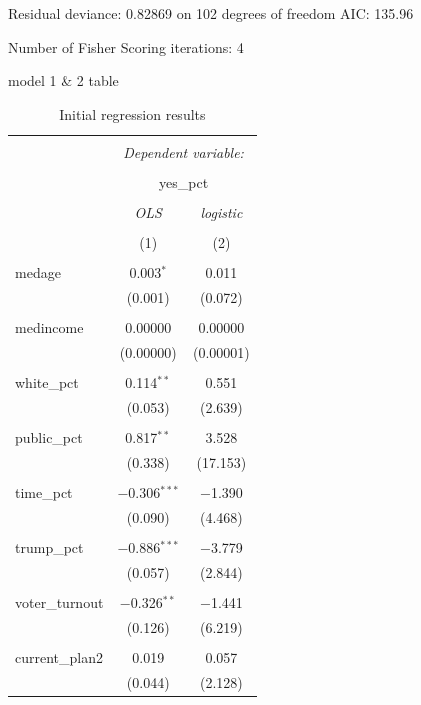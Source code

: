 \documentclass[
]{article}
\begin{document}
Residual deviance: 0.82869 on 102 degrees of freedom AIC: 135.96

Number of Fisher Scoring iterations: 4

model 1 \& 2 table

\begin{table}[!htbp] \centering 
  \caption{Initial regression results} 
  \label{initialResults} 
\begin{tabular}{@{\extracolsep{5pt}}lcc} 
\\[-1.8ex]\hline 
\hline \\[-1.8ex] 
 & \multicolumn{2}{c}{\textit{Dependent variable:}} \\ 
\cline{2-3} 
\\[-1.8ex] & \multicolumn{2}{c}{yes\_pct} \\ 
\\[-1.8ex] & \textit{OLS} & \textit{logistic} \\ 
\\[-1.8ex] & (1) & (2)\\ 
\hline \\[-1.8ex] 
 medage & 0.003$^{*}$ & 0.011 \\ 
  & (0.001) & (0.072) \\ 
  & & \\ 
 medincome & 0.00000 & 0.00000 \\ 
  & (0.00000) & (0.00001) \\ 
  & & \\ 
 white\_pct & 0.114$^{**}$ & 0.551 \\ 
  & (0.053) & (2.639) \\ 
  & & \\ 
 public\_pct & 0.817$^{**}$ & 3.528 \\ 
  & (0.338) & (17.153) \\ 
  & & \\ 
 time\_pct & $-$0.306$^{***}$ & $-$1.390 \\ 
  & (0.090) & (4.468) \\ 
  & & \\ 
 trump\_pct & $-$0.886$^{***}$ & $-$3.779 \\ 
  & (0.057) & (2.844) \\ 
  & & \\ 
 voter\_turnout & $-$0.326$^{**}$ & $-$1.441 \\ 
  & (0.126) & (6.219) \\ 
  & & \\ 
 current\_plan2 & 0.019 & 0.057 \\ 
  & (0.044) & (2.128) \\ 

\end{tabular}
\end{table}
\end{document}
